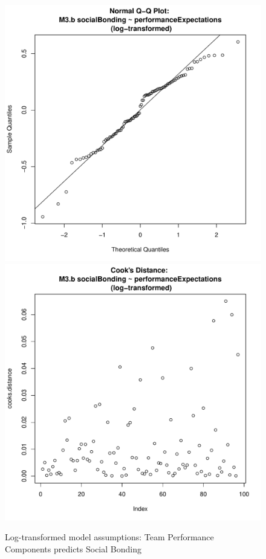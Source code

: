{\begin{figure}[htbp]
        \includegraphics[scale =.4]{images/MLM3bLogQQNorm.pdf}
        \includegraphics[scale =.4]{images/MLM3bLogCooksD.pdf}
        \caption{Log-transformed model assumptions: Team Performance Components predicts Social Bonding}
        \label{fig:MLM3bLogAssumptions}
      \end{figure}




}
